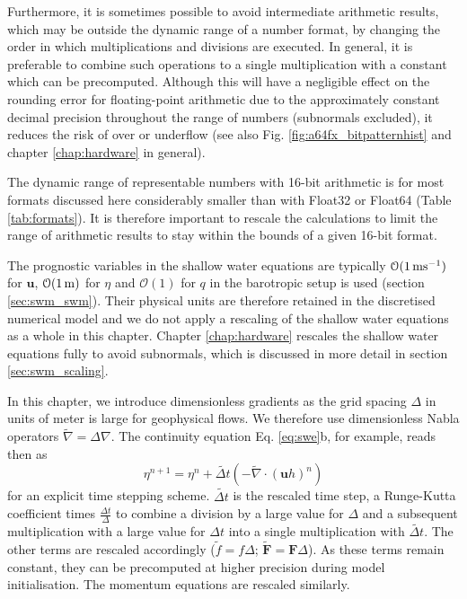 Furthermore, it is sometimes possible to avoid intermediate arithmetic results, which may be outside the dynamic range of a number format,
by changing the order in which multiplications and divisions are executed. In general, it is preferable to combine such operations to a single
multiplication with a constant which can be precomputed. Although this will have a negligible effect on the rounding error for floating-point
arithmetic due to the approximately constant decimal precision throughout the range of numbers (subnormals excluded), it reduces the risk
of over or underflow (see also Fig. \ref{fig:a64fx_bitpatternhist} and chapter \ref{chap:hardware} in general).

The dynamic range of representable numbers with 16-bit arithmetic is for most formats discussed here considerably smaller than with
Float32 or Float64 (Table \ref{tab:formats}). It is therefore important to rescale the calculations to limit the range of arithmetic results to
stay within the bounds of a given 16-bit format.

The prognostic variables in the shallow water equations are typically $\mathcal{O}(1\operatorname{ms}^{-1})$ for $\mathbf{u}$, $\mathcal{O}(1\operatorname{m})$
for $\eta$ and $\mathcal{O}(1)$ for $q$ in the barotropic setup is used (section \ref{sec:swm_swm}). Their physical units are therefore retained
in the discretised numerical model and we do not apply a rescaling of the shallow water equations as a whole in this chapter. Chapter
\ref{chap:hardware} rescales the shallow water equations fully to avoid subnormals, which is discussed in more detail in section
\ref{sec:swm_scaling}.

In this chapter, we introduce dimensionless gradients as the grid spacing $\Delta$ in units of meter is large for geophysical flows.
We therefore use dimensionless Nabla operators $\tilde{\nabla} = \Delta\nabla$. The continuity equation Eq. \ref{eq:swe}b, for example,
reads then as
\begin{equation}
\eta^{n+1} = \eta^n + \tilde{\Delta t}\left( - \tilde{\nabla} \cdot (\mathbf{u}h)^n\right)
\label{eq:discr}
\end{equation}
for an explicit time stepping scheme. $\tilde{\Delta t}$ is the rescaled time step, a Runge-Kutta coefficient times $\tfrac{\Delta t}{\Delta}$ to
combine a division by a large value for $\Delta$ and a subsequent multiplication with a large value for $\Delta t$ into a single multiplication
with $\tilde{\Delta t}$. The other terms are rescaled accordingly ($\tilde{f} = f\Delta$; $\tilde{\mathbf{F}} = \mathbf{F}\Delta$). As these terms
remain constant, they can be precomputed at higher precision during model initialisation. The momentum equations are rescaled similarly.

